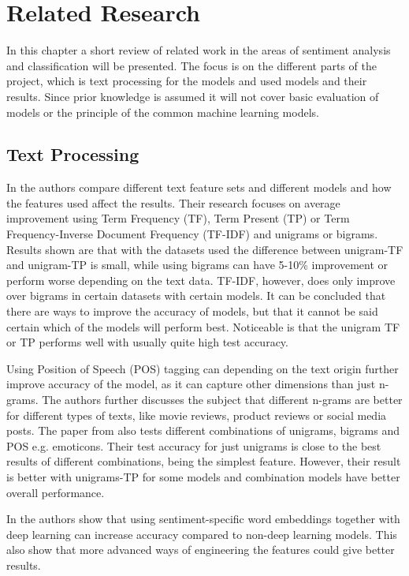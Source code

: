 \chapter{Related Research}
\label{cha:theory}


In this chapter a short review of related work in the areas of sentiment analysis and classification will be presented. 
The focus is on the different parts of the project, which is text processing for the models and used models and their results. 
Since prior knowledge is assumed it will not cover basic evaluation of models or the principle of the common machine learning models. 


\section{Text Processing}
\label{sec:text-processing}


In \cite{gang-wang} the authors compare different text feature sets and different models and how the features used affect the results. 
Their research focuses on average improvement using Term Frequency (TF), Term Present (TP) or Term Frequency-Inverse Document Frequency (TF-IDF) and unigrams or bigrams. 
Results shown are that with the datasets used the difference between unigram-TF and unigram-TP is small, while using bigrams can have 5-10\% improvement or perform worse depending on the text data. 
TF-IDF, however, does only improve over bigrams in certain datasets with certain models. 
It can be concluded that there are ways to improve the accuracy of models, but that it cannot be said certain which of the models will perform best. 
Noticeable is that the unigram TF or TP performs well with usually quite high test accuracy. \cite{gang-wang} 


Using Position of Speech (POS) tagging can depending on the text origin further improve accuracy of the model, as it can capture other dimensions than just n-grams. \cite{pak} 
The authors further discusses the subject that different n-grams are better for different types of texts, like movie reviews, product reviews or social media posts. 
The paper from \cite{pang-bo} also tests different combinations of unigrams, bigrams and POS e.g. emoticons. 
Their test accuracy for just unigrams is close to the best results of different combinations, being the simplest feature. 
However, their result is better with unigrams-TP for some models and combination models have better overall performance. 


In \cite{tang} the authors show that using sentiment-specific word embeddings together with deep learning can increase accuracy compared to non-deep learning models. 
This also show that more advanced ways of engineering the features could give better results.


